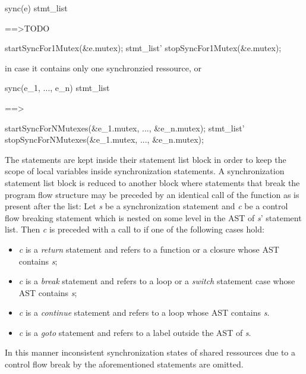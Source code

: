 \begin{center}
\begin{minipage}{0.2\textwidth}
\begin{ccode}
sync(e) stmt_list
\end{ccode}
\end{minipage}
\qquad==>TODO\qquad\qquad
\begin{minipage}{0.3\textwidth}
\begin{ccode}
startSyncFor1Mutex(&e.mutex);
stmt_list'
stopSyncFor1Mutex(&e.mutex);
\end{ccode}
\end{minipage}
\end{center}

in case it contains only one synchronzied ressource, or

\begin{center}
\begin{minipage}{0.3\textwidth}
\begin{ccode}
sync(e_1, ..., e_n) stmt_list
\end{ccode}
\end{minipage}
\qquad==>\qquad\qquad
\begin{minipage}{0.4\textwidth}
\begin{ccode}
startSyncForNMutexes(&e_1.mutex, ..., &e_n.mutex);
stmt_list'
stopSyncForNMutexes(&e_1.mutex, ..., &e_n.mutex);
\end{ccode}
\end{minipage}
\end{center}

The statements are kept inside their statement list block in order to keep the scope of local variables inside synchronization statements. A synchronization statement list block is reduced to another block where statements that break the program flow structure may be preceded by an identical call of the  function as is present after the list: Let \textit{s} be a synchronization statement and \textit{c} be a control flow breaking statement which is nested on some level in the AST of \textit{s}' statement list. Then \textit{c} is preceded with a call to  if one of the following cases hold:
\begin{itemize}
\item \textit{c} is a \textit{return} statement and refers to a function or a closure whose AST contains \textit{s};
\item \textit{c} is a \textit{break} statement and refers to a loop or a \textit{switch} statement case whose AST contains \textit{s};
\item \textit{c} is a \textit{continue} statement and refers to a loop whose AST contains \textit{s}.
\item \textit{c} is a \textit{goto} statement and refers to a label outside the AST of \textit{s}.
\end{itemize}
In this manner inconsistent synchronization states of shared ressources due to a control flow break by the aforementioned statements are omitted. 

